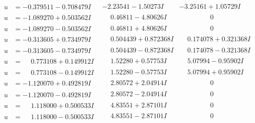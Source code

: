 \documentclass[1p]{elsarticle_modified}
\theoremstyle{definition}
\begin{document}
$$\begin{array}{c|c|c}
\begin{aligned}
u &= -0.379511 - 0.708479 I\end{aligned}
 & -2.23541 - 1.50273 I & -3.25161 + 1.05729 I \\ \hline\begin{aligned}
u &= -1.089270 + 0.503562 I\end{aligned}
 & \phantom{-}0.46811 - 4.80626 I & \phantom{-0.000000 } 0 \\ \hline\begin{aligned}
u &= -1.089270 - 0.503562 I\end{aligned}
 & \phantom{-}0.46811 + 4.80626 I & \phantom{-0.000000 } 0 \\ \hline\begin{aligned}
u &= -0.313605 + 0.734979 I\end{aligned}
 & \phantom{-}0.504439 + 0.872368 I & \phantom{-}0.174078 + 0.321368 I \\ \hline\begin{aligned}
u &= -0.313605 - 0.734979 I\end{aligned}
 & \phantom{-}0.504439 - 0.872368 I & \phantom{-}0.174078 - 0.321368 I \\ \hline\begin{aligned}
u &= \phantom{-}0.773108 + 0.149912 I\end{aligned}
 & \phantom{-}1.52280 + 0.57753 I & \phantom{-}5.07994 - 0.95902 I \\ \hline\begin{aligned}
u &= \phantom{-}0.773108 - 0.149912 I\end{aligned}
 & \phantom{-}1.52280 - 0.57753 I & \phantom{-}5.07994 + 0.95902 I \\ \hline\begin{aligned}
u &= -1.120070 + 0.492819 I\end{aligned}
 & \phantom{-}2.80572 + 2.04914 I & \phantom{-0.000000 } 0 \\ \hline\begin{aligned}
u &= -1.120070 - 0.492819 I\end{aligned}
 & \phantom{-}2.80572 - 2.04914 I & \phantom{-0.000000 } 0 \\ \hline\begin{aligned}
u &= \phantom{-}1.118000 + 0.500533 I\end{aligned}
 & \phantom{-}4.83551 + 2.87101 I & \phantom{-0.000000 } 0 \\ \hline\begin{aligned}
u &= \phantom{-}1.118000 - 0.500533 I\end{aligned}
 & \phantom{-}4.83551 - 2.87101 I & \phantom{-0.000000 } 0 \\ \hline\begin{aligned}

\end{aligned}
\end{array}$$
\end{document}
